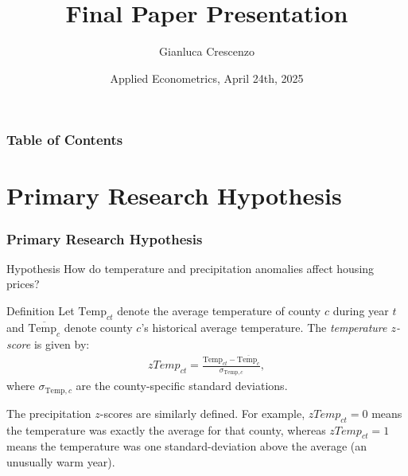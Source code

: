 \documentclass{beamer}
\title[Final Paper Presentation] %
{Final Paper Presentation}
\author[Gianluca Crescenzo] %
{Gianluca Crescenzo}
\date[April 2025] %
{Applied Econometrics, April 24th, 2025}
\begin{document}
\frame{\titlepage}


\begin{frame}
\frametitle{Table of Contents}
\tableofcontents
\end{frame}









\section{Primary Research Hypothesis}
\begin{frame}
\frametitle{Primary Research Hypothesis}
    \pause

    \begin{block}{Hypothesis}
        How do temperature and precipitation anomalies affect housing prices?
    \end{block}
    \pause

    \begin{block}{Definition}
    Let $\text{Temp}_{ct}$ denote the average temperature of county $c$ during year $t$ and $\overline{\text{Temp}_{c}}$ denote county $c$'s historical average temperature. The \textit{temperature $z$-score} is given by:
        \begin{equation*}
        \begin{split}
            zTemp_{ct} = \frac{\text{Temp}_{ct} - \overline{\text{Temp}_{c}}}{\sigma_{\text{Temp},c}},
        \end{split}
        \end{equation*}
    where $\sigma_{\text{Temp},c}$ are the county-specific standard deviations.
    \end{block}
    \pause

    The precipitation $z$-scores are similarly defined. For example, $zTemp_{ct} = 0$ means the temperature was exactly the average for that county, whereas $zTemp_{ct} = 1$ means the temperature was one standard-deviation above the average (an unusually warm year).
\end{frame}
\end{document}

